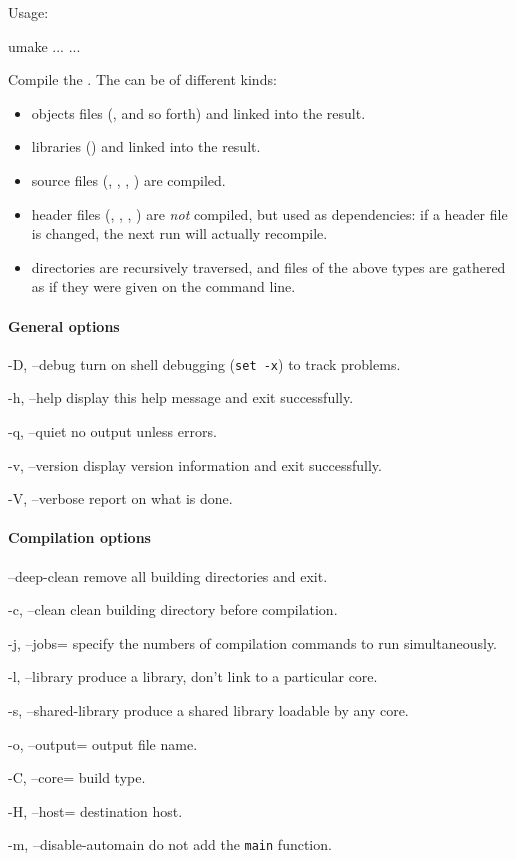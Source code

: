 Usage:
\begin{shell}
umake ... ...
\end{shell}

Compile the .  The  can be of different kinds:
\begin{itemize}
\item objects files (,  and so forth) and linked
  into the result.
\item libraries () and linked into the result.
\item source files (, , , )
  are compiled.
\item header files (, , ,
  ) are \emph{not} compiled, but used as dependencies: if
  a header file is changed, the next  run will actually
  recompile.
\item directories are recursively traversed, and files of the above
  types are gathered as if they were given on the command line.
\end{itemize}

\paragraph{General options}
\begin{options}
\item[-D, --debug] turn on shell debugging (\lstinline|set -x|) to
  track  problems.
\item[-h, --help] display this help message and exit successfully.
\item[-q, --quiet] no output unless errors.
\item[-v, --version] display version information and exit successfully.
\item[-V, --verbose] report on what is done.
\end{options}

\paragraph{Compilation options}
\begin{options}
\item[--deep-clean] remove all building directories and exit.
\item[-c, --clean] clean building directory before compilation.
\item[-j, --jobs=\var{jobs}] specify the numbers of compilation
  commands to run simultaneously.
\item[-l, --library] produce a library, don't link to a particular
  core.
\item[-s, --shared-library] produce a shared library loadable by any
  core.
\item[-o, --output=\var{output}] output file name.
\item[-C, --core=\var{core}] build type.
\item[-H, --host=\var{host}] destination host.
\item[-m, --disable-automain] do not add the \lstinline|main| function.
\end{options}

